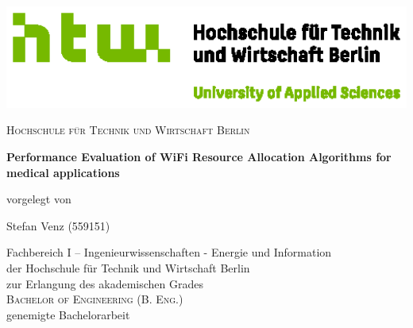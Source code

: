 
\begin{titlepage}
  \begin{center}
	  


	\centering
	\includegraphics[width=15cm]{figures/Q03_HTW_Berlin_Logo_quer_pos_FARBIG_RGB.eps}\\
	\vspace{0.8em}
	\LARGE 

	\textsc{Hochschule für Technik und Wirtschaft Berlin}

    \vspace{1cm}

    \sffamily \LARGE \textbf{Performance Evaluation of WiFi Resource Allocation Algorithms for medical applications }

    \vspace{1.5cm}





    \normalsize vorgelegt von

    \vspace{.1cm}

    \large Stefan Venz (559151)

    \vspace{.8cm}



    \normalsize Fachbereich I -- Ingenieurwissenschaften - Energie und Information\\
    \normalsize der Hochschule für Technik und Wirtschaft Berlin\\
    \normalsize zur Erlangung des akademischen Grades\\
    \large \textsc{Bachelor of Engineering (B. Eng.)}\\
    \normalsize genemigte Bachelorarbeit\\


\end{center}
\end{titlepage}
